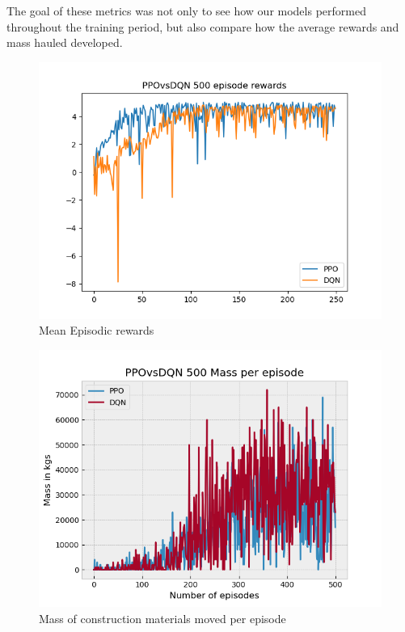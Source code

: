 \documentclass[conference]{IEEEtran}
\begin{document}
The goal of these metrics was not only to see how our models performed throughout the training period, but also compare how the average rewards and mass hauled developed.

\begin{figure}[h!]
	\includegraphics[width=\columnwidth]{graphs/PPOvsDQN250.png}
	\caption{Mean Episodic rewards}
\end{figure}
\begin{figure}[h!]
	\includegraphics[width=\columnwidth]{graphs/PPOvsDQN500mass.png}
	\caption{Mass of construction materials moved per episode}
\end{figure}
\end{document}
